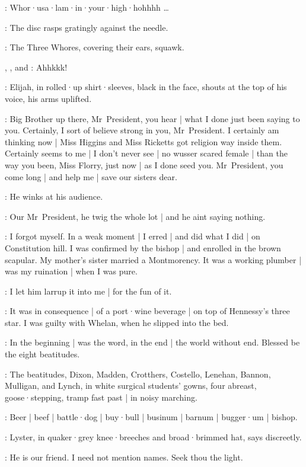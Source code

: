 \Gramophone:
Whor·usa·lam·in·your·high·hohhhh \ldots

:
The disc rasps gratingly against the needle.

:
The Three Whores,
covering their ears,
squawk.

\Zoe,
\Kitty,
and \Florry:
Ahhkkk!

:
Elijah,
in rolled·up shirt·sleeves,
black in the face,
shouts at the top of his voice,
his arms uplifted.

\Elijah:
Big Brother up there,
Mr~President,
you hear |
what I done just been saying to you.
Certainly,
I sort of believe strong in you,
Mr~President.
I certainly am thinking now |
Miss Higgins and Miss Ricketts got religion way inside them.
Certainly seems to me |
I don't never see |
no wusser scared female |
than the way you been,
Miss Florry,
just now |
as I done seed you.
Mr~President,
you come long |
and help me |
save our sisters dear.

:
He winks at his audience.

\Elijah:
Our Mr~President,
he twig the whole lot |
and he aint saying nothing.

\KittyKate[2]:
I forgot myself.
In a weak moment |
I erred |
and did what I did |
on Constitution hill.
I was confirmed by the bishop |
and enrolled in the brown scapular.
My mother's sister married a Montmorency.
It was a working plumber |
was my ruination |
when I was pure.

\ZoeFanny[2]:
I let him larrup it into me |
for the fun of it.

\FlorryTeresa[2]:
It was in consequence |
of a port·wine beverage |
on top of Hennessy's three star.
I was guilty with Whelan,
when he slipped into the bed.

\Stephen[1]:
In the beginning |
was the word,
in the end |
the world without end.
Blessed be the eight beatitudes.

:
The beatitudes,
Dixon,
Madden,
Crotthers,
Costello,
Lenehan,
Bannon,
Mulligan,
and Lynch,
in white surgical students' gowns,
four abreast,
goose·stepping,
tramp fast past |
in noisy marching.

\Beatitudes:
Beer |
beef |
battle·dog |
buy·bull |
businum |
barnum |
bugger·um |
bishop.

:
Lyster,
in quaker·grey knee·breeches and broad·brimmed hat,
says discreetly.

\Lyster:
He is our friend.
I need not mention names.
Seek thou the light.

